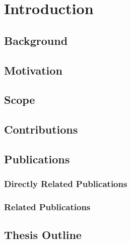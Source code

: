%
\chapter{Introduction}
\label{Chapter1}

\lipsum[3-10]


\section{Background}
\label{Chapter1:Background}


\section{Motivation}
\label{Chapter1:Motivation}


\section{Scope}
\label{Chapter1:Scope}


\section{Contributions}
\label{Chapter1:Contributions}


\section{Publications}
\label{Chapter1:Publications}

\subsection{Directly Related Publications}

\subsection{Related Publications}


\section{Thesis Outline}
\label{Chapter1:ThesisOutline}



